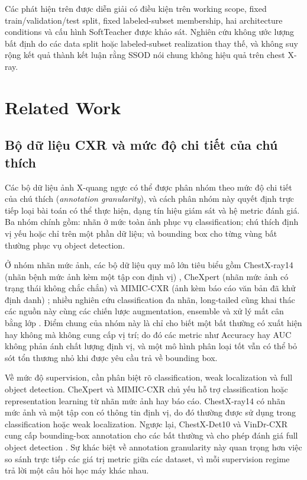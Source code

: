 \documentclass[pdflatex,sn-mathphys-num]{sn-jnl}%
\theoremstyle{thmstyleone}%
\theoremstyle{thmstyletwo}%
\theoremstyle{thmstylethree}%
\begin{document}
Các phát hiện trên được diễn giải có điều kiện trên working scope, fixed
train/validation/test split, fixed labeled-subset membership, hai architecture
conditions và cấu hình SoftTeacher được khảo sát. Nghiên cứu không ước lượng
bất định do các data split hoặc labeled-subset realization thay thế, và không
suy rộng kết quả thành kết luận rằng SSOD nói chung không hiệu quả trên chest
X-ray.

\section{Related Work}\label{sec:related}
 
\subsection{Bộ dữ liệu CXR và mức độ chi tiết của chú thích}
\label{sec:cxr_datasets_annotation_granularity}
 
Các bộ dữ liệu ảnh X-quang ngực có thể được phân nhóm theo mức độ chi tiết của
chú thích (\textit{annotation granularity}), và cách phân nhóm này quyết định
trực tiếp loại bài toán có thể thực hiện, dạng tín hiệu giám sát và hệ metric
đánh giá. Ba nhóm chính gồm: nhãn ở mức toàn ảnh phục vụ classification; chú
thích định vị yếu hoặc chỉ trên một phần dữ liệu; và bounding box cho từng vùng
bất thường phục vụ object detection.
 
Ở nhóm nhãn mức ảnh, các bộ dữ liệu quy mô lớn tiêu biểu gồm ChestX-ray14 (nhãn
bệnh mức ảnh kèm một tập con định vị) \cite{wang2017chestx}, CheXpert (nhãn mức
ảnh có trạng thái không chắc chắn) \cite{irvin2019chexpert} và MIMIC-CXR (ảnh
kèm báo cáo văn bản đã khử định danh) \cite{johnson2019mimic}; nhiều nghiên cứu
classification đa nhãn, long-tailed cũng khai thác các nguồn này cùng các chiến
lược augmentation, ensemble và xử lý mất cân bằng lớp \cite{nguyen2023advanced}.
Điểm chung của nhóm này là chỉ cho biết một bất thường có xuất hiện hay không mà
không cung cấp vị trí; do đó các metric như Accuracy hay AUC không phản ánh chất
lượng định vị, và một mô hình phân loại tốt vẫn có thể bỏ sót tổn thương nhỏ khi
được yêu cầu trả về bounding box.
 
Về mức độ supervision, cần phân biệt rõ classification, weak localization và
full object detection. CheXpert và MIMIC-CXR chủ yếu hỗ trợ classification hoặc
representation learning từ nhãn mức ảnh hay báo cáo. ChestX-ray14 có nhãn mức
ảnh và một tập con có thông tin định vị, do đó thường được sử dụng trong
classification hoặc weak localization. Ngược lại, ChestX-Det10 và VinDr-CXR
cung cấp bounding-box annotation cho các bất thường và cho phép đánh giá full
object detection
\cite{wang2017chestx,irvin2019chexpert,johnson2019mimic,liu2020chestx,nguyen2022vindr}.
Sự khác biệt về annotation granularity này quan trọng hơn việc so sánh trực tiếp
các giá trị metric giữa các dataset, vì mỗi supervision regime trả lời một câu
hỏi học máy khác nhau.
 
\end{document}
